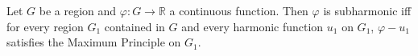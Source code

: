 Let $G$ be a region and $\varphi: G \to \mathbb{R}$ a continuous function. Then $\varphi$ is subharmonic iff for every region $G_1$ contained in $G$ and every harmonic function $u_1$ on $G_1$, $\varphi - u_1$ satisfies the Maximum Principle on $G_1$.